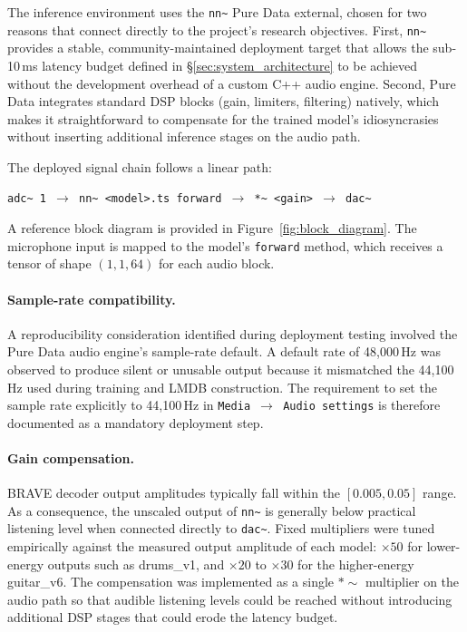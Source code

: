 \documentclass[a4paper,11pt,oneside,openany]{book}
\begin{document}
The inference environment uses the \texttt{nn\textasciitilde} Pure Data external, chosen for two reasons that connect directly to the project's research objectives. First, \texttt{nn\textasciitilde} provides a stable, community-maintained deployment target that allows the sub-10\,ms latency budget defined in \S\ref{sec:system_architecture} to be achieved without the development overhead of a custom C++ audio engine. Second, Pure Data integrates standard DSP blocks (gain, limiters, filtering) natively, which makes it straightforward to compensate for the trained model's idiosyncrasies without inserting additional inference stages on the audio path.

The deployed signal chain follows a linear path:
\begin{center}
{\footnotesize\texttt{adc\textasciitilde\ 1 $\rightarrow$ nn\textasciitilde\ <model>.ts forward $\rightarrow$ *\textasciitilde\ <gain> $\rightarrow$ dac\textasciitilde}}
\end{center}

A reference block diagram is provided in Figure~\ref{fig:block_diagram}. The microphone input is mapped to the model's \texttt{forward} method, which receives a tensor of shape $(1, 1, 64)$ for each audio block.

\paragraph{Sample-rate compatibility.} A reproducibility consideration identified during deployment testing involved the Pure Data audio engine's sample-rate default. A default rate of 48,000\,Hz was observed to produce silent or unusable output because it mismatched the 44,100\,Hz used during training and LMDB construction. The requirement to set the sample rate explicitly to 44,100\,Hz in \texttt{Media $\rightarrow$ Audio settings} is therefore documented as a mandatory deployment step.

\paragraph{Gain compensation.} BRAVE decoder output amplitudes typically fall within the $[0.005, 0.05]$ range. As a consequence, the unscaled output of \texttt{nn\textasciitilde} is generally below practical listening level when connected directly to \texttt{dac\textasciitilde}. Fixed multipliers were tuned empirically against the measured output amplitude of each model: $\times 50$ for lower-energy outputs such as drums\_v1, and $\times 20$ to $\times 30$ for the higher-energy guitar\_v6. The compensation was implemented as a single $*\sim$ multiplier on the audio path so that audible listening levels could be reached without introducing additional DSP stages that could erode the latency budget.
\end{document}
